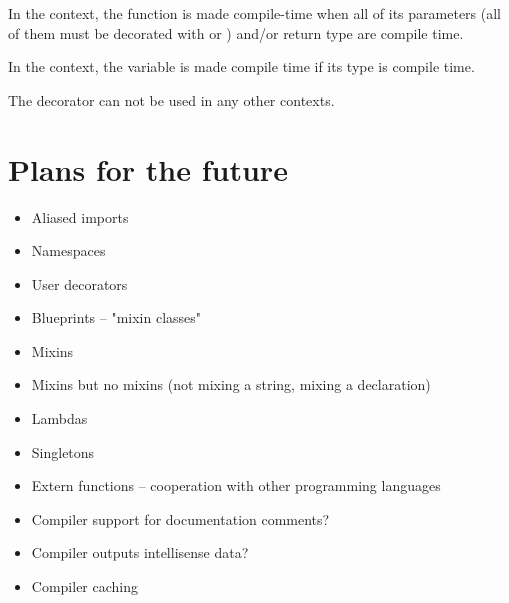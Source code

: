 In the  context, the function is made compile-time when all of its parameters (all of them must be decorated with  or ) and/or return type are compile time.

In the  context, the variable is made compile time if its type is compile time.

The decorator can not be used in any other contexts.

\chapter{Plans for the future}
\begin{itemize}
	\item Aliased imports
	\item Namespaces
	\item User decorators
	\item Blueprints -- "mixin classes"
	\item Mixins
	\item Mixins but no mixins (not mixing a string, mixing a declaration)
	\item Lambdas
	\item Singletons
	\item Extern functions -- cooperation with other programming languages
	\item Compiler support for documentation comments?
	\item Compiler outputs intellisense data?
	\item Compiler caching
\end{itemize}

          
